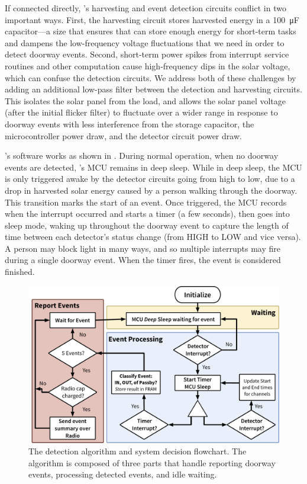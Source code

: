 If connected directly, \sysname's harvesting and event detection circuits conflict in two important ways.
First, the harvesting circuit stores harvested energy in a \SI{100}{\micro\farad} capacitor---a size that ensures that \sysname can store enough energy for short-term tasks and dampens the low-frequency voltage fluctuations that we need in order to detect doorway events.
Second, short-term power spikes from interrupt service routines and other computation cause high-frequency dips in the solar voltage, which can confuse the detection circuits.
We address both of these challenges by adding an additional low-pass filter between the detection and harvesting circuits. This isolates the solar panel from the load, and allows the solar panel voltage (after the initial flicker filter) to fluctuate over a wider range in response to doorway events with less interference from the storage capacitor, the microcontroller power draw, and the detector circuit power draw. 


\sysname's software works as shown in . 
During normal operation, when no doorway events are detected, \sysname's MCU remains in deep sleep.
While in deep sleep, the MCU is only triggered awake by the detector circuits going from high to low, due to a drop in harvested solar energy caused by a person walking through the doorway.
This transition marks the start of an event.
Once triggered, the MCU records when the interrupt occurred and starts a timer (a few seconds), then goes into sleep mode, waking up throughout the doorway event to capture the length of time between each detector's status change (from HIGH to LOW and vice versa).
A person may block light in many ways, and so multiple interrupts may fire during a single doorway event.
When the timer fires, the event is considered finished.

\begin{figure}[t]
\centering
\includegraphics[width=0.75\columnwidth]{figs/software.pdf}
\caption{The \sysname detection algorithm and system decision flowchart. The algorithm is composed of three parts that handle reporting doorway events, processing detected events, and idle waiting. \label{fig:software}}
\end{figure}


